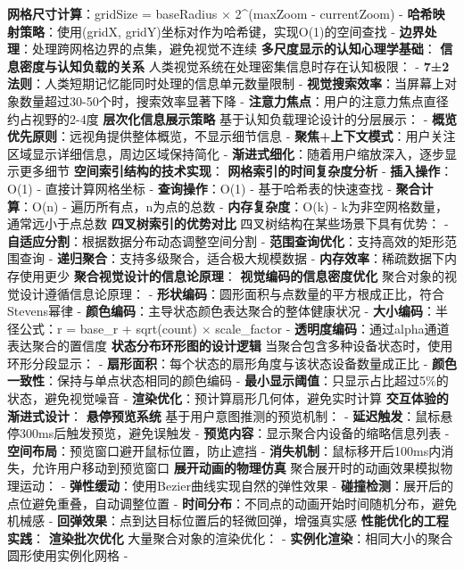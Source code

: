 \textbf{网格尺寸计算}：gridSize = baseRadius × 2\^{}(maxZoom - currentZoom) - \textbf{哈希映射策略}：使用(gridX, gridY)坐标对作为哈希键，实现O(1)的空间查找 - \textbf{边界处理}：处理跨网格边界的点集，避免视觉不连续 \textbf{多尺度显示的认知心理学基础}： \textbf{信息密度与认知负载的关系} 人类视觉系统在处理密集信息时存在认知极限： - \textbf{7±2法则}：人类短期记忆能同时处理的信息单元数量限制 - \textbf{视觉搜索效率}：当屏幕上对象数量超过30-50个时，搜索效率显著下降 - \textbf{注意力焦点}：用户的注意力焦点直径约占视野的2-4度 \textbf{层次化信息展示策略} 基于认知负载理论设计的分层展示： - \textbf{概览优先原则}：远视角提供整体概览，不显示细节信息 - \textbf{聚焦+上下文模式}：用户关注区域显示详细信息，周边区域保持简化 - \textbf{渐进式细化}：随着用户缩放深入，逐步显示更多细节 \textbf{空间索引结构的技术实现}： \textbf{网格索引的时间复杂度分析} - \textbf{插入操作}：O(1) - 直接计算网格坐标 - \textbf{查询操作}：O(1) - 基于哈希表的快速查找 - \textbf{聚合计算}：O(n) - 遍历所有点，n为点的总数 - \textbf{内存复杂度}：O(k) - k为非空网格数量，通常远小于点总数 \textbf{四叉树索引的优势对比} 四叉树结构在某些场景下具有优势： - \textbf{自适应分割}：根据数据分布动态调整空间分割 - \textbf{范围查询优化}：支持高效的矩形范围查询 - \textbf{递归聚合}：支持多级聚合，适合极大规模数据 - \textbf{内存效率}：稀疏数据下内存使用更少 \textbf{聚合视觉设计的信息论原理}： \textbf{视觉编码的信息密度优化} 聚合对象的视觉设计遵循信息论原理： - \textbf{形状编码}：圆形面积与点数量的平方根成正比，符合Stevens幂律 - \textbf{颜色编码}：主导状态颜色表达聚合的整体健康状况 - \textbf{大小编码}：半径公式：r = base\_r + sqrt(count) × scale\_factor - \textbf{透明度编码}：通过alpha通道表达聚合的置信度 \textbf{状态分布环形图的设计逻辑} 当聚合包含多种设备状态时，使用环形分段显示： - \textbf{扇形面积}：每个状态的扇形角度与该状态设备数量成正比 - \textbf{颜色一致性}：保持与单点状态相同的颜色编码 - \textbf{最小显示阈值}：只显示占比超过5\%的状态，避免视觉噪音 - \textbf{渲染优化}：预计算扇形几何体，避免实时计算 \textbf{交互体验的渐进式设计}： \textbf{悬停预览系统} 基于用户意图推测的预览机制： - \textbf{延迟触发}：鼠标悬停300ms后触发预览，避免误触发 - \textbf{预览内容}：显示聚合内设备的缩略信息列表 - \textbf{空间布局}：预览窗口避开鼠标位置，防止遮挡 - \textbf{消失机制}：鼠标移开后100ms内消失，允许用户移动到预览窗口 \textbf{展开动画的物理仿真} 聚合展开时的动画效果模拟物理运动： - \textbf{弹性缓动}：使用Bezier曲线实现自然的弹性效果 - \textbf{碰撞检测}：展开后的点位避免重叠，自动调整位置 - \textbf{时间分布}：不同点的动画开始时间随机分布，避免机械感 - \textbf{回弹效果}：点到达目标位置后的轻微回弹，增强真实感 \textbf{性能优化的工程实践}： \textbf{渲染批次优化} 大量聚合对象的渲染优化： - \textbf{实例化渲染}：相同大小的聚合圆形使用实例化网格 - 